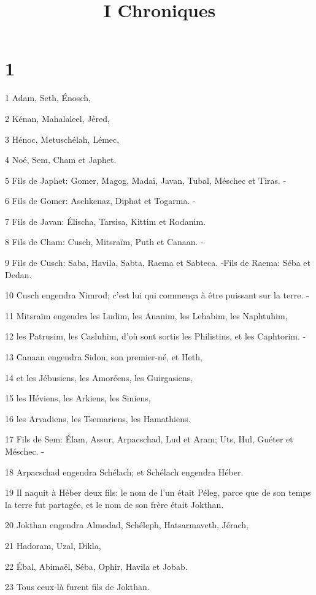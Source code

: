 

\title{I Chroniques}


\chapter{1}

\par 1 Adam, Seth, Énosch,
\par 2 Kénan, Mahalaleel, Jéred,
\par 3 Hénoc, Metuschélah, Lémec,
\par 4 Noé, Sem, Cham et Japhet.
\par 5 Fils de Japhet: Gomer, Magog, Madaï, Javan, Tubal, Méschec et Tiras. -
\par 6 Fils de Gomer: Aschkenaz, Diphat et Togarma. -
\par 7 Fils de Javan: Élischa, Tarsisa, Kittim et Rodanim.
\par 8 Fils de Cham: Cusch, Mitsraïm, Puth et Canaan. -
\par 9 Fils de Cusch: Saba, Havila, Sabta, Raema et Sabteca. -Fils de Raema: Séba et Dedan.
\par 10 Cusch engendra Nimrod; c'est lui qui commença à être puissant sur la terre. -
\par 11 Mitsraïm engendra les Ludim, les Ananim, les Lehabim, les Naphtuhim,
\par 12 les Patrusim, les Casluhim, d'où sont sortis les Philistins, et les Caphtorim. -
\par 13 Canaan engendra Sidon, son premier-né, et Heth,
\par 14 et les Jébusiens, les Amoréens, les Guirgasiens,
\par 15 les Héviens, les Arkiens, les Siniens,
\par 16 les Arvadiens, les Tsemariens, les Hamathiens.
\par 17 Fils de Sem: Élam, Assur, Arpacschad, Lud et Aram; Uts, Hul, Guéter et Méschec. -
\par 18 Arpacschad engendra Schélach; et Schélach engendra Héber.
\par 19 Il naquit à Héber deux fils: le nom de l'un était Péleg, parce que de son temps la terre fut partagée, et le nom de son frère était Jokthan.
\par 20 Jokthan engendra Almodad, Schéleph, Hatsarmaveth, Jérach,
\par 21 Hadoram, Uzal, Dikla,
\par 22 Ébal, Abimaël, Séba, Ophir, Havila et Jobab.
\par 23 Tous ceux-là furent fils de Jokthan.
